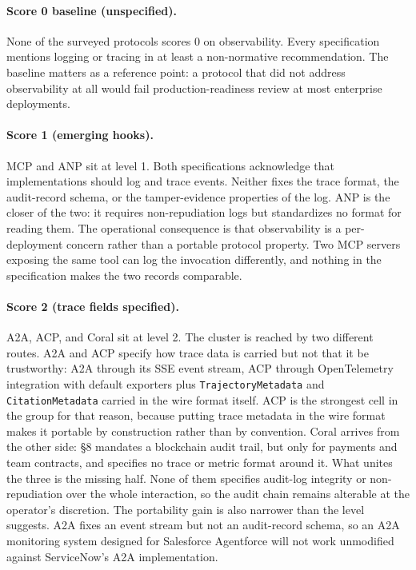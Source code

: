 \paragraph{Score 0 baseline (unspecified).}
None of the surveyed protocols scores 0 on
observability. Every specification mentions logging
or tracing in at least a non-normative recommendation.
The baseline matters as a reference point: a protocol
that did not address observability at all would fail
production-readiness review at most enterprise
deployments.

\paragraph{Score 1 (emerging hooks).}
MCP and ANP sit at level 1. Both specifications
acknowledge that implementations should log and trace
events. Neither fixes the trace format, the
audit-record schema, or the tamper-evidence properties
of the log. ANP is the closer of the two: it requires
non-repudiation logs but standardizes no format for
reading them. The operational consequence is that
observability is a per-deployment concern rather than a
portable protocol property. Two MCP servers exposing
the same tool can log the invocation differently, and
nothing in the specification makes the two records
comparable.

\paragraph{Score 2 (trace fields specified).}
A2A, ACP, and Coral sit at level 2. The cluster is
reached by two different routes. A2A and ACP specify how
trace data is carried but not that it be trustworthy:
A2A through its SSE event stream, ACP through
OpenTelemetry integration with default exporters plus
\texttt{TrajectoryMetadata} and
\texttt{CitationMetadata} carried in the wire format
itself. ACP is the strongest cell in the group for that
reason, because putting trace metadata in the wire
format makes it portable by construction rather than by
convention. Coral arrives from the other side: \S 8
mandates a blockchain audit trail, but only for payments
and team contracts, and specifies no trace or metric
format around it. What unites the three is the missing
half. None of them specifies audit-log integrity or
non-repudiation over the whole interaction, so the audit
chain remains alterable at the operator's discretion.
The portability gain is also narrower than the level
suggests. A2A fixes an event stream but not an
audit-record schema, so an A2A monitoring system
designed for Salesforce Agentforce will not work
unmodified against ServiceNow's A2A implementation.

